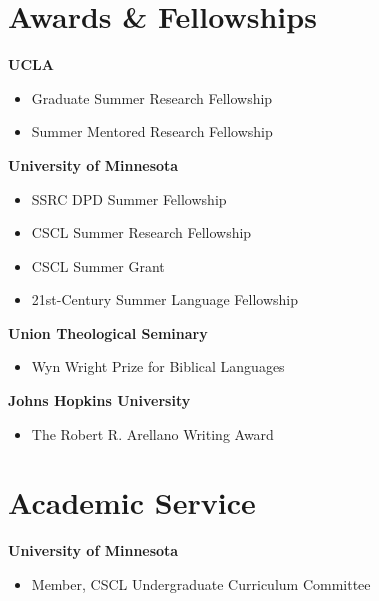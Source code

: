 \documentclass[10pt,letterpaper]{article}
\begin{document}
\section*{Awards \& Fellowships}

\noindent\textbf{UCLA}
\begin{itemize}[leftmargin=1.3em, itemsep=1.5pt, parsep=0pt, topsep=1.5pt]
    \item Graduate Summer Research Fellowship
    \item Summer Mentored Research Fellowship
\end{itemize}

\vspace{0.25em}
\noindent\textbf{University of Minnesota}
\begin{itemize}[leftmargin=1.3em, itemsep=1.5pt, parsep=0pt, topsep=1.5pt]
    \item SSRC DPD Summer Fellowship
    \item CSCL Summer Research Fellowship
    \item CSCL Summer Grant
    \item 21st-Century Summer Language Fellowship
\end{itemize}

\vspace{0.25em}
\noindent\textbf{Union Theological Seminary}
\begin{itemize}[leftmargin=1.3em, itemsep=1.5pt, parsep=0pt, topsep=1.5pt]
    \item Wyn Wright Prize for Biblical Languages
\end{itemize}

\vspace{0.25em}
\noindent\textbf{Johns Hopkins University}
\begin{itemize}[leftmargin=1.3em, itemsep=1.5pt, parsep=0pt, topsep=1.5pt]
    \item The Robert R. Arellano Writing Award
\end{itemize}

\section*{Academic Service}

\noindent\textbf{University of Minnesota}
\begin{itemize}[leftmargin=1.3em, itemsep=1.5pt, parsep=0pt, topsep=1.5pt]
    \item Member, CSCL Undergraduate Curriculum Committee
\end{itemize}
\end{document}
